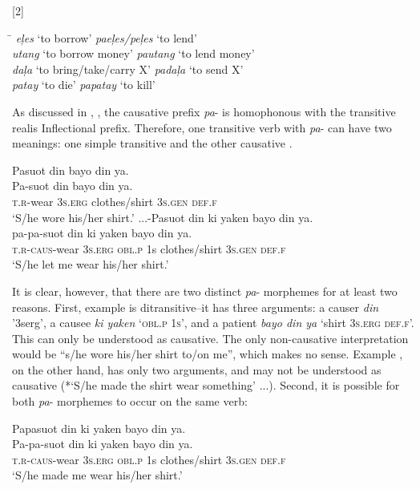 [2]
\ea
\label{bkm:Ref501438581}
\begin{tabbing}
\hspace{5cm} \= \kill
\textit{eļes} ‘to borrow’ \> \textit{paeļes/peļes} ‘to lend’ \\
\textit{utang} ‘to borrow money’ \> \textit{pautang} ‘to lend money’ \\
\textit{daļa} ‘to bring/take/carry X’   \> \textit{padaļa} ‘to send X’ \\
\textit{patay} ‘to die’ \> \textit{papatay} ‘to kill’
\end{tabbing}
\z


As discussed in , , the causative prefix \textit{pa}{}- is homophonous with the transitive realis Inflectional prefix. Therefore, one transitive verb with \textit{pa}{}- can have two meanings: one simple transitive  and the other causative .

\ea
\label{bkm:Ref501092121}
Pasuot  din  bayo  din  ya. \\\smallskip
\gll Pa-suot  din  bayo  din  ya. \\
\textsc{t.r}-wear  3\textsc{s.erg}  clothes/shirt  3\textsc{s.gen}  \textsc{def.f} \\
\glt ‘S/he wore his/her shirt.’
\z
\ea
\label{bkm:Ref329253035}
...-Pasuot  din  ki  yaken  bayo  din  ya. \\\smallskip
\gll pa-pa-suot  din  ki  yaken  bayo  din  ya. \\
\textsc{t.r-caus}-wear  3\textsc{s.erg}  \textsc{obl.p}  1s  clothes/shirt  3\textsc{s.gen}  \textsc{def.f} \\
\glt ‘S/he let me wear his/her shirt.’
\z

It is clear, however, that there are two distinct \textit{pa}{}- morphemes for at least two reasons. First, example  is ditransitive--it has three arguments: a causer \textit{din} '3serg', a causee \textit{ki yaken} `\textsc{obl.p 1s}', and a patient \textit{bayo din ya} `shirt 3\textsc{s.erg def.f}'. This can only be understood as causative. The only non-causative interpretation would be “s/he wore his/her shirt to/on me”, which makes no sense. Example , on the other hand, has only two arguments, and may not be understood as causative (*‘S/he made the shirt wear something’ ...). Second, it is possible for both \textit{pa}{}- morphemes to occur on the same verb:

\ea
\label{ex:his/hershirt}
Papasuot  din  ki  yaken  bayo  din  ya. \\\smallskip
\gll Pa-pa-suot  din  ki  yaken  bayo  din  ya. \\
\textsc{t.r-caus}-wear  3\textsc{s.erg}  \textsc{obl.p}  1s  clothes/shirt  3\textsc{s.gen}  \textsc{def.f} \\
\glt ‘S/he made me wear his/her shirt.’
\z

